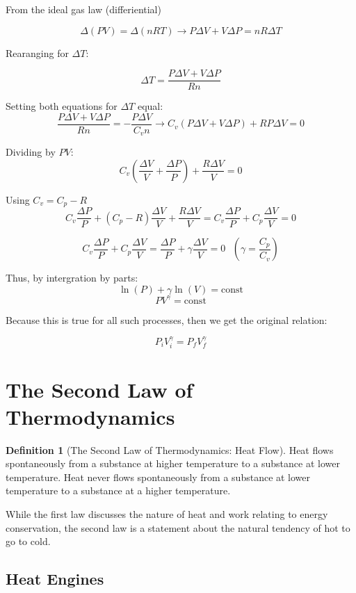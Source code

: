 \documentclass[12pt, a4paper]{article}
\theoremstyle{definition}
\newtheorem{definition}{Definition}
\begin{document}
From the ideal gas law (differiential)

\[\Delta (PV) = \Delta (nRT) \rightarrow P\Delta V + V \Delta P = nR \Delta T\]

Rearanging for $\Delta T$:

\[\Delta T = \frac{P\Delta V + V \Delta P}{Rn}\]

Setting both equations for $\Delta T$ equal:
\[\frac{P\Delta V + V \Delta P}{Rn} = -\frac{P \Delta V}{C_v n} \rightarrow C_v (P\Delta V + V\Delta P) + RP \Delta V = 0\]

Dividing by $PV$:
\[C_v (\frac{\Delta V}{V} + \frac{\Delta P}{P}) + \frac{R\Delta V}{V} = 0\]

Using $C_v = C_p - R$
\[C_v \frac{\Delta P}{P} + (C_p - R)\frac{\Delta V}{V} + \frac{R\Delta V}{V} = C_v \frac{\Delta P}{P} + C_p \frac{\Delta V}{V} = 0\]

\[C_v \frac{\Delta P}{P} + C_p \frac{\Delta V}{V} = \frac{\Delta P}{P} + \gamma \frac{\Delta V}{V} = 0 \textrm{ } (\gamma = \frac{C_p}{C_v})\] %

Thus, by intergration by parts:
\[\ln(P) + \gamma \ln(V) = \textrm{const}\]
\[PV^{\gamma} = \textrm{const}\]

Because this is true for all such processes, then we get the original relation:

\[P_i V_i^\gamma = P_f V_f^\gamma\]

\section{The Second Law of Thermodynamics}
\begin{definition}[The Second Law of Thermodynamics: Heat Flow]
    Heat flows spontaneously from a substance at higher temperature to a substance at lower temperature.
    Heat never flows spontaneously from a substance at lower temperature to a substance at a higher temperature.
\end{definition}

While the first law discusses the nature of heat and work relating to energy conservation, the second law is a statement about the natural tendency of hot to go to cold.

\subsection{Heat Engines}
\end{document}

